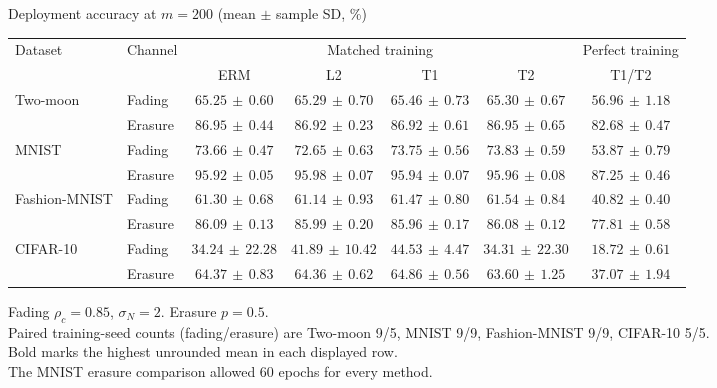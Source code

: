 \documentclass[border=4pt]{standalone}
\begin{document}
\begin{minipage}{7.8in}
\centering
Deployment accuracy at $m=200$ (mean $\pm$ sample SD, \%)\\[4pt]
\begin{tabular*}{\linewidth}{@{\extracolsep{\fill}}llccccc@{}}
\toprule
\multirow{2}{*}{Dataset} & \multirow{2}{*}{Channel} & \multicolumn{4}{c}{Matched training} & Perfect training \\
\cmidrule(lr){3-6}\cmidrule(l){7-7}
 & & ERM & L2 & T1 & T2 & T1/T2 \\
\midrule
\multirow{2}{*}{Two-moon} & Fading & $65.25\,\pm\,0.60$ & $65.29\,\pm\,0.70$ & $\mathbf{65.46}\,\pm\,0.73$ & $65.30\,\pm\,0.67$ & $56.96\,\pm\,1.18$ \\
 & Erasure & $86.95\,\pm\,0.44$ & $86.92\,\pm\,0.23$ & $86.92\,\pm\,0.61$ & $\mathbf{86.95}\,\pm\,0.65$ & $82.68\,\pm\,0.47$ \\
\midrule[0.25pt]
\multirow{2}{*}{MNIST} & Fading & $73.66\,\pm\,0.47$ & $72.65\,\pm\,0.63$ & $73.75\,\pm\,0.56$ & $\mathbf{73.83}\,\pm\,0.59$ & $53.87\,\pm\,0.79$ \\
 & Erasure & $95.92\,\pm\,0.05$ & $\mathbf{95.98}\,\pm\,0.07$ & $95.94\,\pm\,0.07$ & $95.96\,\pm\,0.08$ & $87.25\,\pm\,0.46$ \\
\midrule[0.25pt]
\multirow{2}{*}{Fashion-MNIST} & Fading & $61.30\,\pm\,0.68$ & $61.14\,\pm\,0.93$ & $61.47\,\pm\,0.80$ & $\mathbf{61.54}\,\pm\,0.84$ & $40.82\,\pm\,0.40$ \\
 & Erasure & $\mathbf{86.09}\,\pm\,0.13$ & $85.99\,\pm\,0.20$ & $85.96\,\pm\,0.17$ & $86.08\,\pm\,0.12$ & $77.81\,\pm\,0.58$ \\
\midrule[0.25pt]
\multirow{2}{*}{CIFAR-10} & Fading & $34.24\,\pm\,22.28$ & $41.89\,\pm\,10.42$ & $\mathbf{44.53}\,\pm\,4.47$ & $34.31\,\pm\,22.30$ & $18.72\,\pm\,0.61$ \\
 & Erasure & $64.37\,\pm\,0.83$ & $64.36\,\pm\,0.62$ & $\mathbf{64.86}\,\pm\,0.56$ & $63.60\,\pm\,1.25$ & $37.07\,\pm\,1.94$ \\
\bottomrule
\end{tabular*}
\par\smallskip\raggedright\footnotesize
Fading $\rho_c=0.85$, $\sigma_N=2$. Erasure $p=0.5$.\\
Paired training-seed counts (fading/erasure) are Two-moon 9/5, MNIST 9/9, Fashion-MNIST 9/9, CIFAR-10 5/5.\\
Bold marks the highest unrounded mean in each displayed row.\\
The MNIST erasure comparison allowed 60 epochs for every method.
\end{minipage}
\end{document}
